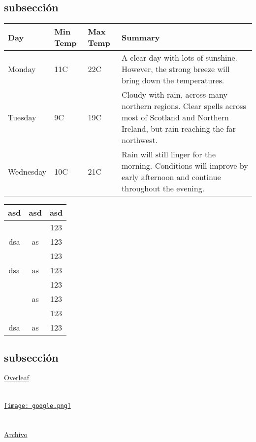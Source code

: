 \subsection{subsecci\'on}
\begin{center}
    \begin{tabular}{ | l | l | l | p{5cm} |}
    \hline
    Day & Min Temp & Max Temp & Summary \\ \hline
    Monday & 11C & 22C & A clear day with lots of sunshine.
    However, the strong breeze will bring down the temperatures. \\ \hline
    Tuesday & 9C & 19C & Cloudy with rain, across many northern regions. Clear spells
    across most of Scotland and Northern Ireland,
    but rain reaching the far northwest. \\ \hline
    Wednesday & 10C & 21C & Rain will still linger for the morning.
    Conditions will improve by early afternoon and continue
    throughout the evening. \\
    \hline
    \end{tabular}
\end{center}

\begin{center}
\begin{tabular}{|c|c|c|}
  \hline
  \textbf{asd}     & \textbf{asd} & \textbf{asd}\\\hline\hline
      &			     			  & 123 \\ \cline{3-3}
  dsa& \multirow{-2}{*}{as} & 123\\ \hline
      &			                  & 123 \\ \cline{3-3}
  dsa& \multirow{-2}{*}{as} & 123\\ \hline
              &			& 123\\ \cline{3-3}
                & \multirow{-2}{*}{as} & 123\\ \cline{2-2}\cline{3-3}
               & 			&123\\ \cline{3-3}
  \multirow{-4}{*}{dsa} & \multirow{-2}{*}{as} & 123\\\hline
\end{tabular}
\end{center}

\subsection{subsecci\'on}
\href{https://www.overleaf.com}{Overleaf}\\\\\\
\href{http://www.google.com.ar}{\texttt{[image: google.png]}}\\\\\\
\href{run:Documents/prueba.pdf}{Archivo}

